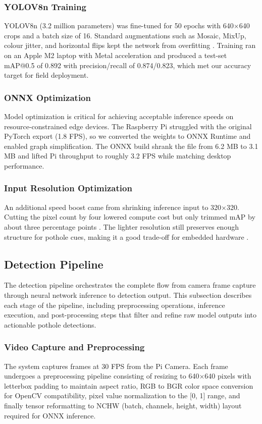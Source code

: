 \documentclass{ieeeaccess}
\begin{document}
\subsubsection{YOLOV8n Training}
YOLOV8n (3.2 million parameters) was fine-tuned for 50 epochs with 640$\times$640 crops and a batch size of 16. Standard augmentations such as Mosaic, MixUp, colour jitter, and horizontal flips kept the network from overfitting \cite{b2}. Training ran on an Apple M2 laptop with Metal acceleration and produced a test-set mAP@0.5 of 0.892 with precision/recall of 0.874/0.823, which met our accuracy target for field deployment.

\subsubsection{ONNX Optimization}
Model optimization is critical for achieving acceptable inference speeds on resource-constrained edge devices. The Raspberry Pi struggled with the original PyTorch export (1.8 FPS), so we converted the weights to ONNX Runtime and enabled graph simplification. The ONNX build shrank the file from 6.2 MB to 3.1 MB and lifted Pi throughput to roughly 3.2 FPS while matching desktop performance.

\subsubsection{Input Resolution Optimization}
An additional speed boost came from shrinking inference input to 320$\times$320. Cutting the pixel count by four lowered compute cost but only trimmed mAP by about three percentage points \cite{b10}. The lighter resolution still preserves enough structure for pothole cues, making it a good trade-off for embedded hardware \cite{b8}.

\subsection{Detection Pipeline}

The detection pipeline orchestrates the complete flow from camera frame capture through neural network inference to detection output. This subsection describes each stage of the pipeline, including preprocessing operations, inference execution, and post-processing steps that filter and refine raw model outputs into actionable pothole detections.

\subsubsection{Video Capture and Preprocessing}
The system captures frames at 30 FPS from the Pi Camera. Each frame undergoes a preprocessing pipeline consisting of resizing to 640$\times$640 pixels with letterbox padding to maintain aspect ratio, RGB to BGR color space conversion for OpenCV compatibility, pixel value normalization to the [0, 1] range, and finally tensor reformatting to NCHW (batch, channels, height, width) layout required for ONNX inference.
\end{document}
